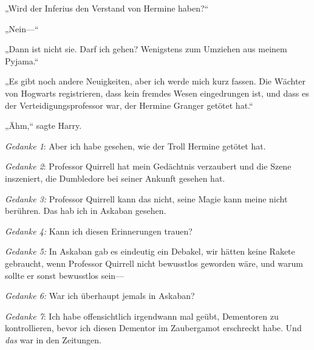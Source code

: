 „Wird der Inferius den Verstand von Hermine haben?“

„Nein—“

„Dann ist nicht sie. Darf ich gehen? Wenigstens zum Umziehen aus meinem Pyjama.“

„Es gibt noch andere Neuigkeiten, aber ich werde mich kurz fassen. Die Wächter von Hogwarts registrieren, dass kein fremdes Wesen eingedrungen ist, und dass es der Verteidigungsprofessor war, der Hermine Granger getötet hat.“

„Ähm,“ sagte Harry.

\emph{Gedanke 1}: Aber ich habe gesehen, wie der Troll Hermine getötet hat.

\emph{Gedanke 2}: Professor Quirrell hat mein Gedächtnis verzaubert und die Szene inszeniert, die Dumbledore bei seiner Ankunft gesehen hat.

\emph{Gedanke 3:} Professor Quirrell kann das nicht, seine Magie kann meine nicht berühren. Das hab ich in Askaban gesehen.

\emph{Gedanke 4:} Kann ich diesen Erinnerungen trauen?

\emph{Gedanke 5:} In Askaban gab es eindeutig ein Debakel, wir hätten keine Rakete gebraucht, wenn Professor Quirrell nicht bewusstlos geworden wäre, und warum sollte er sonst bewusstlos sein—

\emph{Gedanke 6:} War ich überhaupt jemals in Askaban?

\emph{Gedanke 7}: Ich habe offensichtlich irgendwann mal geübt, Dementoren zu kontrollieren, bevor ich diesen Dementor im Zaubergamot erschreckt habe. Und \emph{das} war in den Zeitungen.

